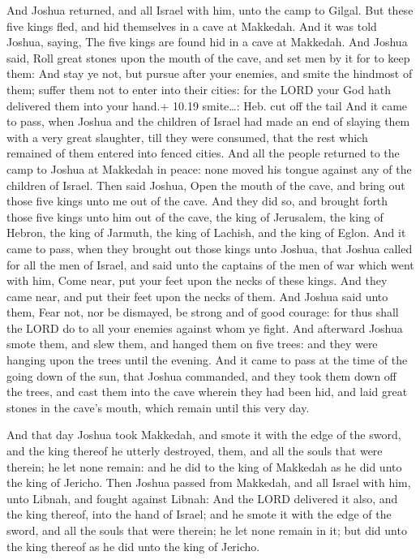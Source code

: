  And Joshua returned, and all Israel with him, unto the
camp to Gilgal.  But these five kings fled, and hid
themselves in a cave at Makkedah.  And it was told Joshua,
saying, The five kings are found hid in a cave at Makkedah.
 And Joshua said, Roll great stones upon the mouth of the
cave, and set men by it for to keep them:  And stay ye not,
but pursue after your enemies, and smite the hindmost of them; suffer
them not to enter into their cities: for the LORD your God hath
delivered them into your hand.+ 10.19 smite\ldots: Heb. cut off the tail
 And it came to pass, when Joshua and the children of
Israel had made an end of slaying them with a very great slaughter, till
they were consumed, that the rest which remained of them entered into
fenced cities.  And all the people returned to the camp to
Joshua at Makkedah in peace: none moved his tongue against any of the
children of Israel.  Then said Joshua, Open the mouth of
the cave, and bring out those five kings unto me out of the cave.
 And they did so, and brought forth those five kings unto
him out of the cave, the king of Jerusalem, the king of Hebron, the king
of Jarmuth, the king of Lachish, and the king of Eglon. 
And it came to pass, when they brought out those kings unto Joshua, that
Joshua called for all the men of Israel, and said unto the captains of
the men of war which went with him, Come near, put your feet upon the
necks of these kings. And they came near, and put their feet upon the
necks of them.  And Joshua said unto them, Fear not, nor be
dismayed, be strong and of good courage: for thus shall the LORD do to
all your enemies against whom ye fight.  And afterward
Joshua smote them, and slew them, and hanged them on five trees: and
they were hanging upon the trees until the evening.  And it
came to pass at the time of the going down of the sun, that Joshua
commanded, and they took them down off the trees, and cast them into the
cave wherein they had been hid, and laid great stones in the cave's
mouth, which remain until this very day.

 And that day Joshua took Makkedah, and smote it with the
edge of the sword, and the king thereof he utterly destroyed, them, and
all the souls that were therein; he let none remain: and he did to the
king of Makkedah as he did unto the king of Jericho.  Then
Joshua passed from Makkedah, and all Israel with him, unto Libnah, and
fought against Libnah:  And the LORD delivered it also, and
the king thereof, into the hand of Israel; and he smote it with the edge
of the sword, and all the souls that were therein; he let none remain in
it; but did unto the king thereof as he did unto the king of Jericho.

